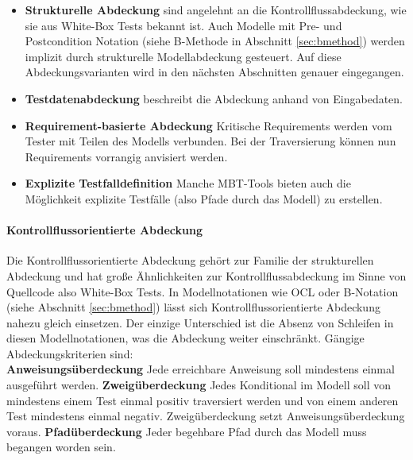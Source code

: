 \begin{itemize}
\item \textbf{Strukturelle Abdeckung} sind angelehnt an die Kontrollflussabdeckung, wie sie aus White-Box Tests bekannt ist. Auch Modelle mit Pre- und Postcondition Notation (siehe B-Methode in Abschnitt \ref{sec:bmethod}) werden implizit durch strukturelle Modellabdeckung gesteuert. Auf diese Abdeckungsvarianten wird in den nächsten Abschnitten genauer eingegangen.
\item \textbf{Testdatenabdeckung} beschreibt die Abdeckung anhand von Eingabedaten.
\item \textbf{Requirement-basierte Abdeckung} Kritische Requirements werden vom Tester mit Teilen des Modells verbunden. Bei der Traversierung können nun Requirements vorrangig anvisiert werden.
\item \textbf{Explizite Testfalldefinition} Manche MBT-Tools bieten auch die Möglichkeit explizite Testfälle (also Pfade durch das Modell) zu erstellen.
\end{itemize}

\paragraph{Kontrollflussorientierte Abdeckung}
Die Kontrollflussorientierte Abdeckung gehört zur Familie der strukturellen Abdeckung und hat große Ähnlichkeiten zur Kontrollflussabdeckung im Sinne von Quellcode also White-Box Tests. In Modellnotationen wie OCL oder B-Notation (siehe Abschnitt \ref{sec:bmethod}) lässt sich Kontrollflussorientierte Abdeckung nahezu gleich einsetzen. Der einzige Unterschied ist die Absenz von Schleifen in diesen Modellnotationen, was die Abdeckung weiter einschränkt. Gängige Abdeckungskriterien sind:\cite{rossner_basiswissen_2010}\\
\textbf{Anweisungsüberdeckung} Jede erreichbare Anweisung soll mindestens einmal ausgeführt werden.
\textbf{Zweigüberdeckung} Jedes Konditional im Modell soll von mindestens einem Test einmal positiv traversiert werden und von einem anderen Test mindestens einmal negativ. Zweigüberdeckung setzt Anweisungsüberdeckung voraus.
\textbf{Pfadüberdeckung} Jeder begehbare Pfad durch das Modell muss begangen worden sein.

